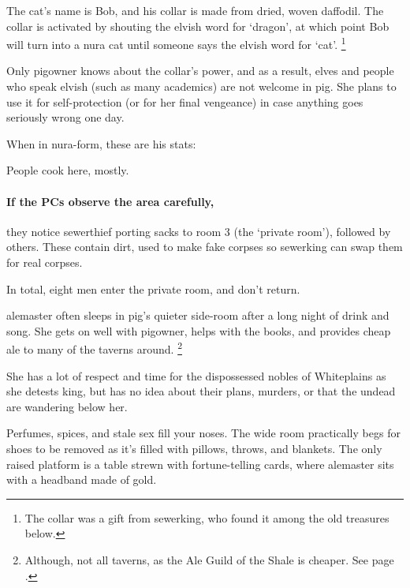 \begin{multicols}{2}
\begin{boxtext}
\end{boxtext}

The cat's name is Bob, and his collar is made from dried, woven daffodil.  The collar is activated by shouting the elvish word for `dragon', at which point Bob will turn into a nura cat until someone says the elvish word for `cat'.%
\footnote{The collar was a gift from \gls{sewerking}, who found it among the old treasures below.}

Only \gls{pigowner} knows about the collar's power, and as a result, elves and people who speak elvish (such as many academics) are not welcome in \gls{pig}.
She plans to use it for self-protection (or for her final vengeance) in case anything goes seriously wrong one day.

When in nura-form, these are his stats:



People cook here, mostly.

\paragraph{If the PCs observe the area carefully,}
they notice \gls{sewerthief} porting sacks to room 3 (the `private room'), followed by others.
These contain dirt, used to make fake corpses so \gls{sewerking} can swap them for real corpses.

In total, eight men enter the private room, and don't return.

\pigowner


\Gls{alemaster} often sleeps in \gls{pig}'s quieter side-room after a long night of drink and song.
She gets on well with \gls{pigowner}, helps with the books, and provides cheap ale to many of the taverns around.%
\footnote{Although, not all taverns, as the Ale Guild of the Shale is cheaper.
See page \pageref{troubleAle}.}

She has a lot of respect and time for the dispossessed nobles of Whiteplains as she detests \gls{king}, but has no idea about their plans, murders, or that the undead are wandering below her.

\begin{boxtext}

  Perfumes, spices, and stale sex fill your noses.
  The wide room practically begs for shoes to be removed as it's filled with pillows, throws, and blankets.
  The only raised platform is a table strewn with fortune-telling cards, where \gls{alemaster} sits with a headband made of gold.


\end{boxtext}
\end{multicols}
